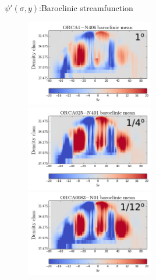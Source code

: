 \documentclass{beamer}
\begin{document}
\begin{frame}{$\psi'(\sigma, y)$:Baroclinic streamfunction}
 \begin{figure}[H]
\centering
\includegraphics[width=0.5\textwidth]{mocsigORCA1_barocMeanStreatchedP.png}
\includegraphics[width=0.5\textwidth]{mocsigORCA025_barocMeanStreatchedP.png}\\
\vspace{-0.2cm}
\includegraphics[width=0.5\textwidth]{mocsigORCA12_barocMeanStreatchedP.png}

\end{figure}
\end{frame}
\end{document}
